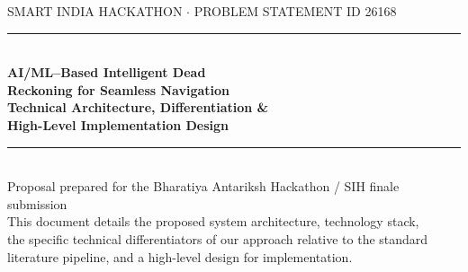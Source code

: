 \documentclass[10.5pt]{article}
\begin{document}
\begin{titlepage}
\begin{center}
\vspace*{0.6cm}

{\small\color{softgray} SMART INDIA HACKATHON $\cdot$ PROBLEM STATEMENT ID 26168}\\[0.3cm]
{\color{ruleline}\rule{\linewidth}{0.6pt}}\\[1.0cm]

{\Huge\bfseries\color{isroblue} AI/ML--Based Intelligent Dead\\[0.2cm] Reckoning for Seamless Navigation}\\[0.8cm]

{\Large\color{accent}\textbf{Technical Architecture, Differentiation \&}}\\[0.15cm]
{\Large\color{accent}\textbf{High-Level Implementation Design}}\\[1.4cm]


\vspace{1.6cm}

{\color{ruleline}\rule{0.5\linewidth}{0.4pt}}\\[0.5cm]
{\large\color{softgray} Proposal prepared for the Bharatiya Antariksh Hackathon / SIH finale submission}\\[0.2cm]
{\small\color{softgray} This document details the proposed system architecture, technology stack,\\
the specific technical differentiators of our approach relative to the standard\\
literature pipeline, and a high-level design for implementation.}

\end{center}
\vfill
\restoregeometry
\end{titlepage}
\end{document}

